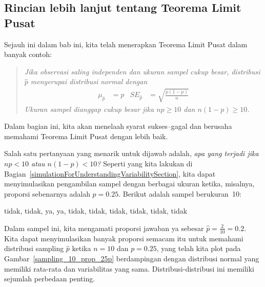 \D{\newpage}

\subsection{Rincian lebih lanjut tentang Teorema Limit Pusat}

\noindent%
Sejauh ini dalam bab ini, kita telah menerapkan Teorema Limit Pusat
dalam banyak contoh:
\begin{quote}{\em
Jika observasi saling independen dan ukuran sampel
cukup besar, distribusi $\hat{p}$ menyerupai
distribusi normal dengan
\begin{align*}
  \mu_{\hat{p}} &= p
  &SE_{\hat{p}} &= \sqrt{\frac{p (1 - p)}{n}}
\end{align*}
Ukuran sampel dianggap cukup besar
jika $n p \geq 10$ dan $n (1 - p) \geq 10$.
}\end{quote}
Dalam bagian ini, kita akan menelaah syarat sukses--gagal
dan berusaha memahami
Teorema Limit Pusat dengan lebih baik.

Salah satu pertanyaan yang menarik untuk dijawab adalah, \emph{apa yang terjadi jika
$np < 10$ atau $n(1-p) < 10$?} Seperti yang kita lakukan di
Bagian~\ref{simulationForUnderstandingVariabilitySection},
kita dapat menyimulasikan pengambilan sampel dengan berbagai ukuran ketika,
misalnya, proporsi sebenarnya adalah $p = 0.25$.
Berikut adalah sampel berukuran~10:
\begin{center}
tidak, tidak, ya, ya, tidak, tidak, tidak, tidak, tidak, tidak
\end{center}
Dalam sampel ini, kita mengamati proporsi jawaban ya
sebesar $\hat{p} = \frac{2}{10} = 0.2$. Kita dapat menyimulasikan banyak
proporsi semacam itu untuk memahami distribusi sampling
$\hat{p}$ ketika $n = 10$ dan $p = 0.25$, yang telah kita plot
pada Gambar~\ref{sampling_10_prop_25p}
berdampingan dengan distribusi normal yang memiliki
rata-rata dan variabilitas yang sama.
Distribusi-distribusi ini memiliki sejumlah perbedaan penting.

